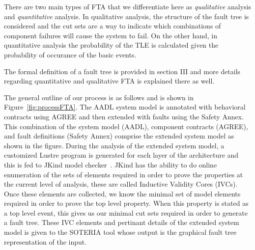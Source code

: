 There are two main types of FTA that we differentiate here as \textit{qualitative} analysis and \textit{quantitative} analysis. In qualitative analysis, the structure of the fault tree is considered and the cut sets are a way to indicate which combinations of component failures will cause the system to fail. On the other hand, in quantitative analysis the probability of the TLE is calculated given the probability of occurance of the basic events. 

The formal definition of a fault tree is provided in section III and more details regarding quantitative and qualitative FTA is explained there as well. 

The general outline of our process is as follows and is shown in Figure~\ref{fig:processFTA}. The AADL system model is annotated with behavioral contracts using AGREE and then extended with faults using the Safety Annex. This combination of the system model (AADL), component contracts (AGREE), and fault definitions (Safety Annex) comprise the extended system model as shown in the figure. During the analysis of the extended system model, a customized Lustre program is generated for each layer of the architecture and this is fed to JKind model checker~\cite{2017arXiv171201222G}. JKind has the ability to do online enumeration of the sets of elements required in order to prove the properties at the current level of analysis, these are called Inductive Validity Cores (IVCs). Once these elements are collected, we know the minimal set of model elements required in order to prove the top level property. When this property is stated as a top level event, this gives us our minimal cut sets required in order to generate a fault tree. These IVC elements and pertinant details of the extended system model is given to the SOTERIA tool whose output is the graphical fault tree representation of the input. 

